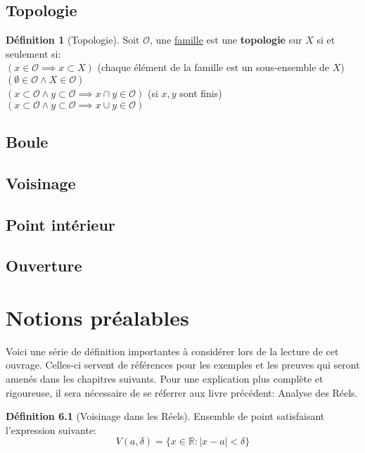 \documentclass[12pt]{book}
\let\Bbb\mathbb
\theoremstyle{definition}
\newtheorem{definition}{Définition}[section]
\begin{document}
\section{Topologie}
\begin{definition}[Topologie]
    \label{def:topologie} 
    Soit $\mathcal{O}$, une \hyperref[def:famille]{famille} est une \textbf{topologie} sur $X$ si et seulement si:\\
    $(x \in \mathcal{O} \implies x \subset X)$ (chaque élément de la famille est un sous-ensemble de $X$)\\
    $(\emptyset \in \mathcal{O} \land X \in \mathcal{O})$ \\
    $(x \subset \mathcal{O} \land y \subset \mathcal{O} \implies x \cap y \in \mathcal{O})$ (si $x,y$ sont finis) \\
    $(x \subset \mathcal{O} \land y \subset \mathcal{O} \implies x \cup y \in \mathcal{O})$ \\
\end{definition}
\section{Boule}
\section{Voisinage}
\section{Point intérieur}
\section{Ouverture}


\appendix
\chapter{Notions préalables}
Voici une série de définition importantes à considérer lors de la lecture de cet ouvrage. Celles-ci servent
de références pour les exemples et les preuves qui seront amenés dans les chapitres suivants. Pour une explication
plus complète et rigoureuse, il sera nécessaire de se réferrer aux livre précédent: Analyse des Réels.

\begin{definition}[Voisinage dans les Réels]
    \label{def:voisinage_reels}
    Ensemble de point satisfaisant l'expression
    suivante: $$V(a, \delta) = \{ x \in \Bbb R : |x - a| < \delta \}$$
\end{definition}
\end{document}
